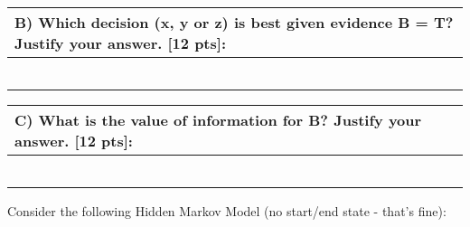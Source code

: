 \documentclass[assignment={3},
	duedate={Sunday, March 31, 2024, 11:59 PM CST},
	points={80},
	type={Written},
	template=true
]{cs581homework}
\begin{document}
\begin{table}[H]
	\centering
	\begin{tabular}{|p{\textwidth}|}
		\hline
		\textbf{B) Which decision (x, y or z) is best given evidence B = T? Justify your answer. [12 pts]:}\\
		\hline
		\iftemplate
		\vspace*{1in}~\\
		\else
		\fi
		\hline
	\end{tabular}
\end{table}

\begin{table}[H]
	\centering
	\begin{tabular}{|p{\textwidth}|}
		\hline
		\textbf{C) What is the value of information for B? Justify your answer. [12 pts]:}\\
		\hline
		\iftemplate
		\vspace*{1in}~\\
		\else
		\fi
		\hline
	\end{tabular}
\end{table}

Consider the following Hidden Markov Model (no start/end state - that's fine):
\end{document}
